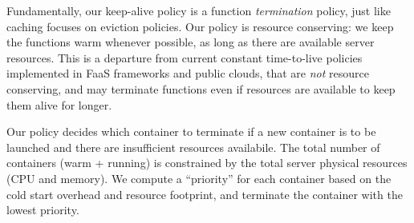 Fundamentally, our keep-alive policy is a function \emph{termination} policy, just like caching focuses on eviction policies.  
Our policy is resource conserving: we keep the functions warm whenever possible, as long as there are available server resources. 
This is a departure from current constant time-to-live policies implemented in FaaS frameworks and public clouds, that are \emph{not} resource conserving, and may terminate functions even if resources are available to keep them alive for longer. 

Our policy decides which container to terminate if a new container is to be launched and there are insufficient resources availabile. 
The total number of containers (warm + running) is constrained by the total server physical resources (CPU and memory). 
We compute a ``priority'' for each container based on the cold start overhead and resource footprint, and terminate the container with the lowest priority.
%


%
%
%
%

%






